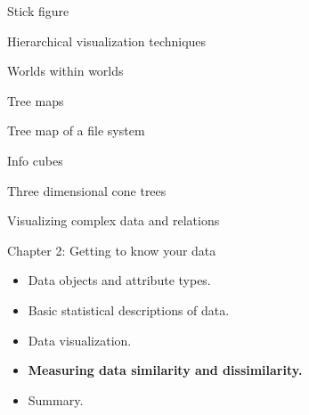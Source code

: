 \documentclass[aspectratio=169,t]{beamer}
\begin{document}
  { 
    \begin{frame}{Stick figure}
    \centering
    
    \end{frame}
  }

  { 
    \begin{frame}{Hierarchical visualization techniques}
    \centering
    
    \end{frame}
  }

  { 
    \begin{frame}{Worlds within worlds}
    \centering
    
    \end{frame}
  }

  { 
    \begin{frame}{Tree maps}
    \centering
    
    \end{frame}
  }

  { 
    \begin{frame}{Tree map of a file system}
    \centering
    
    \end{frame}
  }

  { 
    \begin{frame}{Info cubes}
    \centering
    
    \end{frame}
  }

  { 
    \begin{frame}{Three dimensional cone trees}
    \centering
    
    \end{frame}
  }

  { 
    \begin{frame}{Visualizing complex data and relations}
    \centering
    
    \end{frame}
  }

  { 
    \begin{frame}{Chapter 2: Getting to know your data}
    \centering
    \begin{itemize}
        \item Data objects and attribute types.
        \item Basic statistical descriptions of data.
        \item Data visualization.
        \item \textbf{Measuring data similarity and dissimilarity.}
        \item Summary.
    \end{itemize}
    \end{frame}
  }
\end{document}
